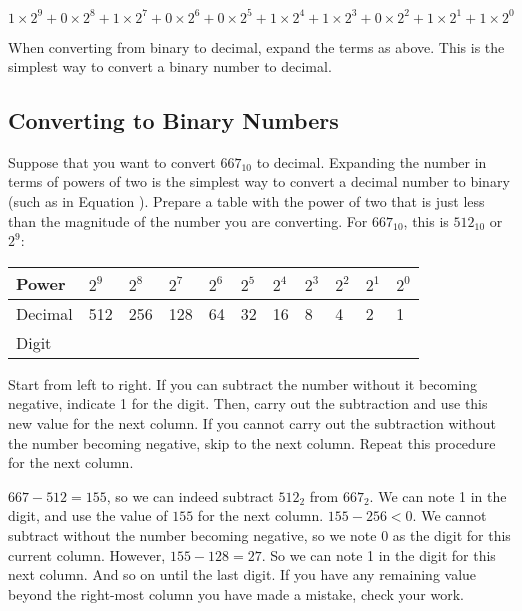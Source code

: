 \documentclass[11pt]{book}
\begin{document}
\begin{equation}\label{sec:data:bases:667bin}
	1 \times 2^9 + 0 \times 2^8 + 1 \times 2^7 + 0 \times 2^6 + 0 \times 2^5 + 1 \times 2^4 + 1 \times 2^3 + 0 \times 2^2 + 1 \times 2^1 + 1 \times 2^0
\end{equation}

When converting from binary to decimal, expand the terms as above. This is the simplest way to convert a binary number to decimal.

\subsection{Converting to Binary Numbers\label{sec:data:bases:bin}}

Suppose that you want to convert $667_{10}$ to decimal. Expanding the number in terms of powers of two is the simplest way to convert a decimal number to binary (such as in Equation \label{sec:data:bases:667bin}). Prepare a table with the power of two that is just less than the magnitude of the number you are converting. For $667_{10}$, this is $512_{10}$ or $2^9$:

\vspace{1em}
\begin{tabular}{|l|l|l|l|l|l|l|l|l|l|l|}\hline
Power & $2^9$ & $2^8$ & $2^7$ & $2^6$ & $2^5$ & $2^4$ & $2^3$ & $2^2$ & $2^1$ & $2^0$ \\\hline\hline
Decimal & 512 & 256 & 128 & 64 & 32 & 16 & 8 & 4 & 2 & 1 \\\hline
Digit &  &  &  &  &  &  &  &  &  &  \\\hline
\end{tabular}

\vspace{1em}
Start from left to right. If you can subtract the number without it becoming negative, indicate 1 for the digit. Then, carry out the subtraction and use this new value for the next column. If you cannot carry out the subtraction without the number becoming negative, skip to the next column. Repeat this procedure for the next column.

 $667-512=155$, so we can indeed subtract $512_2$ from $667_2$. We can note 1 in the digit, and use the value of $155$ for the next column. $155-256<0$. We cannot subtract without the number becoming negative, so we note 0 as the digit for this current column. However, $155-128=27$. So we can note 1 in the digit for this next column. And so on until the last digit. If you have any remaining value beyond the right-most column you have made a mistake, check your work.
\end{document}
